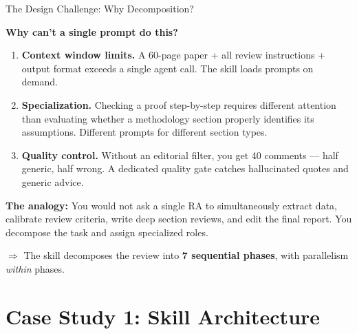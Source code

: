 \documentclass[10pt,english,aspectratio=169]{beamer}
\begin{document}
\begin{frame}{The Design Challenge: Why Decomposition?}

\textbf{Why can't a single prompt do this?}

\vspace{0.3cm}
\begin{enumerate}
    \item \textbf{Context window limits.} A 60-page paper + all review instructions + output format exceeds a single agent call. The skill loads prompts on demand.

    \vspace{0.2cm}
    \item \textbf{Specialization.} Checking a proof step-by-step requires different attention than evaluating whether a methodology section properly identifies its assumptions. Different prompts for different section types.

    \vspace{0.2cm}
    \item \textbf{Quality control.} Without an editorial filter, you get 40 comments --- half generic, half wrong. A dedicated quality gate catches hallucinated quotes and generic advice.
\end{enumerate}

\vspace{0.3cm}
\textbf{The analogy:} You would not ask a single RA to simultaneously extract data, calibrate review criteria, write deep section reviews, and edit the final report. You decompose the task and assign specialized roles.

\vspace{0.2cm}
$\Rightarrow$ The skill decomposes the review into \textbf{7 sequential phases}, with parallelism \emph{within} phases.

\end{frame}


\section{Case Study 1: Skill Architecture}
\end{document}
